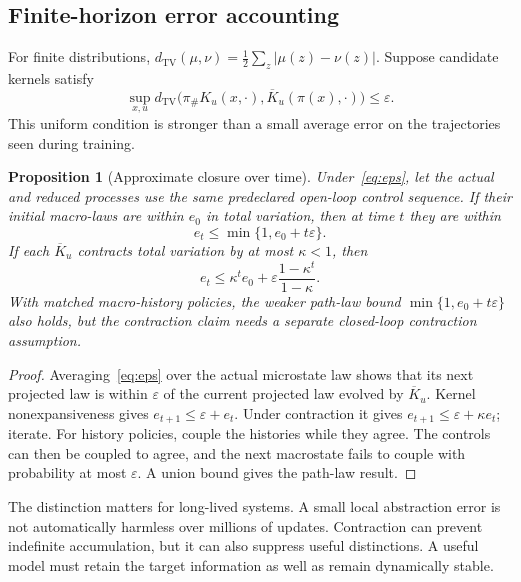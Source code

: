 \documentclass[11pt,letterpaper]{article}
\theoremstyle{plain}
\newtheorem{proposition}{Proposition}[section]
\theoremstyle{definition}
\theoremstyle{remark}
\newcommand{\TV}{d_{\mathrm{TV}}}
\newcommand{\push}{\pi_{\#}}
\begin{document}
\subsection{Finite-horizon error accounting}
For finite distributions, $\TV(\mu,\nu)=\tfrac12\sum_z|\mu(z)-\nu(z)|$. Suppose candidate kernels satisfy
\begin{equation}\label{eq:eps}
\sup_{x,u}\TV\bigl(\push K_u(x,\cdot),\overline K_u(\pi(x),\cdot)\bigr)
\leq\varepsilon.
\end{equation}
This uniform condition is stronger than a small average error on the trajectories seen during training.

\begin{proposition}[Approximate closure over time]\label{prop:time}
Under~\eqref{eq:eps}, let the actual and reduced processes use the same predeclared open-loop control sequence. If their initial macro-laws are within $e_0$ in total variation, then at time $t$ they are within
\[
e_t\leq\min\{1,e_0+t\varepsilon\}.
\]
If each $\overline K_u$ contracts total variation by at most $\kappa<1$, then
\begin{equation}\label{eq:contract}
e_t\leq\kappa^t e_0+\varepsilon\frac{1-\kappa^t}{1-\kappa}.
\end{equation}
With matched macro-history policies, the weaker path-law bound $\min\{1,e_0+t\varepsilon\}$ also holds, but the contraction claim needs a separate closed-loop contraction assumption.
\end{proposition}
\begin{proof}
Averaging~\eqref{eq:eps} over the actual microstate law shows that its next projected law is within $\varepsilon$ of the current projected law evolved by $\overline K_u$. Kernel nonexpansiveness gives $e_{t+1}\leq\varepsilon+e_t$. Under contraction it gives $e_{t+1}\leq\varepsilon+\kappa e_t$; iterate. For history policies, couple the histories while they agree. The controls can then be coupled to agree, and the next macrostate fails to couple with probability at most $\varepsilon$. A union bound gives the path-law result.
\end{proof}

The distinction matters for long-lived systems. A small local abstraction error is not automatically harmless over millions of updates. Contraction can prevent indefinite accumulation, but it can also suppress useful distinctions. A useful model must retain the target information as well as remain dynamically stable.
\end{document}
